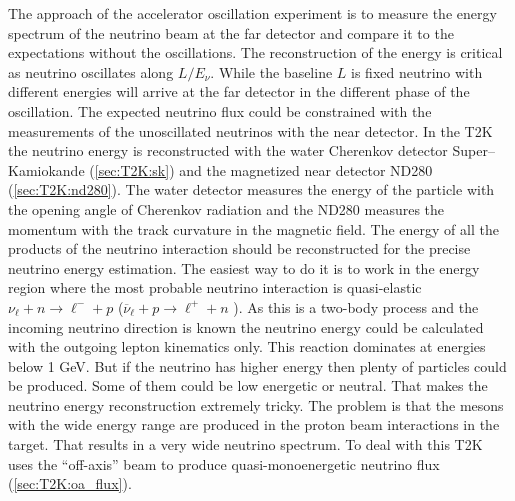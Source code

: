 \documentclass[../main.tex]{subfiles}
\begin{document}
The approach of the accelerator oscillation experiment is to measure the energy spectrum of the neutrino beam at the far detector and compare it to the expectations without the oscillations. The reconstruction of the energy is critical as neutrino oscillates along $L/E_\nu$. While the baseline $L$ is fixed neutrino with different energies will arrive at the far detector in the different phase of the oscillation. The expected neutrino flux could be constrained with the measurements of the unoscillated neutrinos with the near detector. In the T2K the neutrino energy is reconstructed with the water Cherenkov detector Super--Kamiokande (\autoref{sec:T2K:sk}) and the magnetized near detector ND280 (\autoref{sec:T2K:nd280}). The water detector measures the energy of the particle with the opening angle of Cherenkov radiation and the ND280 measures the momentum with the track curvature in the magnetic field. The energy of all the products of the neutrino interaction should be reconstructed for the precise neutrino energy estimation. The easiest way to do it is to work in the energy region where the most probable neutrino interaction is quasi-elastic $\nu_\ell+n\to\ell^-+p$ ($\overline{\nu}_\ell+p\to\ell^++n$ ). As this is a two-body process and the incoming neutrino direction is known the neutrino energy could be calculated with the outgoing lepton kinematics only. This reaction dominates at energies below 1 GeV. But if the neutrino has higher energy then plenty of particles could be produced. Some of them could be low energetic or neutral. That makes the neutrino energy reconstruction extremely tricky. The problem is that the mesons with the wide energy range are produced in the proton beam interactions in the target. That results in a very wide neutrino spectrum. To deal with this T2K uses the ``off-axis'' beam to produce quasi-monoenergetic neutrino flux (\autoref{sec:T2K:oa_flux}).
\end{document}
